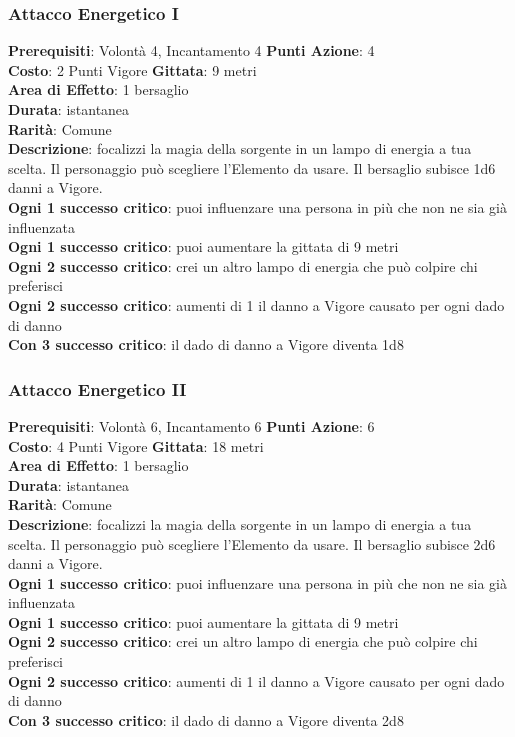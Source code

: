 \documentclass[12pt,a4paper,twoside,openany]{book}
\begin{document}
\begin{multicols}{2}


\subsubsection*{Attacco Energetico I}
\textbf{Prerequisiti}: Volontà 4, Incantamento 4
\textbf{Punti Azione}: 4\\
\textbf{Costo}: 2 Punti Vigore
\textbf{Gittata}: 9 metri\\
\textbf{Area di Effetto}: 1 bersaglio\\
\textbf{Durata}: istantanea\\
\textbf{Rarità}: Comune\\
\textbf{Descrizione}: focalizzi la magia della sorgente in un lampo di energia a tua scelta. Il personaggio può scegliere l'Elemento da usare.
Il bersaglio subisce 1d6 danni a Vigore.\\
\textbf{Ogni 1 successo critico}: puoi influenzare una persona in più che non ne sia già influenzata\\
\textbf{Ogni 1 successo critico}: puoi aumentare la gittata di 9 metri\\
\textbf{Ogni 2 successo critico}: crei un altro lampo di energia che può colpire chi preferisci\\
\textbf{Ogni 2 successo critico}: aumenti di 1 il danno a Vigore causato per ogni dado di danno\\
\textbf{Con 3 successo critico}: il dado di danno a Vigore diventa 1d8

\subsubsection*{Attacco Energetico II}
\textbf{Prerequisiti}: Volontà 6, Incantamento 6
\textbf{Punti Azione}: 6\\
\textbf{Costo}: 4 Punti Vigore
\textbf{Gittata}: 18 metri\\
\textbf{Area di Effetto}: 1 bersaglio\\
\textbf{Durata}: istantanea\\
\textbf{Rarità}: Comune\\
\textbf{Descrizione}: focalizzi la magia della sorgente in un lampo di energia a tua scelta. Il personaggio può scegliere l'Elemento da usare.
Il bersaglio subisce 2d6 danni a Vigore.\\
\textbf{Ogni 1 successo critico}: puoi influenzare una persona in più che non ne sia già influenzata\\
\textbf{Ogni 1 successo critico}: puoi aumentare la gittata di 9 metri\\
\textbf{Ogni 2 successo critico}: crei un altro lampo di energia che può colpire chi preferisci\\
\textbf{Ogni 2 successo critico}: aumenti di 1 il danno a Vigore causato per ogni dado di danno\\
\textbf{Con 3 successo critico}: il dado di danno a Vigore diventa 2d8


\end{multicols}
\end{document}
